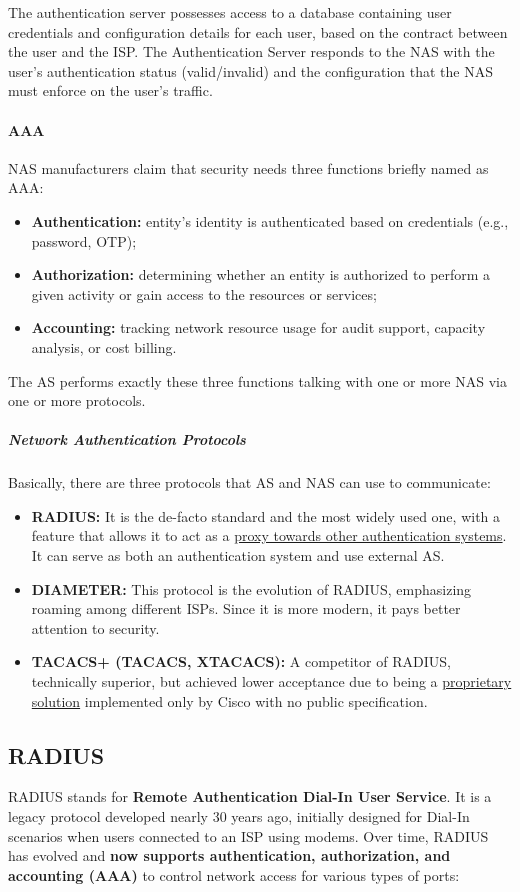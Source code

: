 The authentication server possesses access to a database containing user credentials and configuration details for each user, based on the contract between the user and the ISP. The Authentication Server responds to the NAS with the user's authentication status (valid/invalid) and the configuration that the NAS must enforce on the user's traffic.

\paragraph{AAA}
NAS manufacturers claim that security needs three functions briefly named as AAA:
\begin{itemize}
    \item \textbf{Authentication:} entity's identity is authenticated based on credentials (e.g., password, OTP);
    \item \textbf{Authorization:} determining whether an entity is authorized to perform a given activity or gain access to the resources or services;
    \item \textbf{Accounting:} tracking network resource usage for audit support, capacity analysis, or cost billing.
\end{itemize}

The AS performs exactly these three functions talking with one or more NAS via one or more protocols.

\subparagraph{Network Authentication Protocols}
Basically, there are three protocols that AS and NAS can use to communicate:
\begin{itemize}
    \item \textbf{RADIUS:} It is the de-facto standard and the most widely used one, with a feature that allows it to act as a \underline{proxy towards other authentication systems}. It can serve as both an authentication system and use external AS.
    \item \textbf{DIAMETER:} This protocol is the evolution of RADIUS, emphasizing roaming among different ISPs. Since it is more modern, it pays better attention to security.
    \item \textbf{TACACS+ (TACACS, XTACACS):} A competitor of RADIUS, technically superior, but achieved lower acceptance due to being a \underline{proprietary solution} implemented only by Cisco with no public specification.
\end{itemize}


\subsection{RADIUS}
RADIUS stands for \textbf{Remote Authentication Dial-In User Service}. It is a legacy protocol developed nearly 30 years ago, initially designed for Dial-In scenarios when users connected to an ISP using modems. Over time, RADIUS has evolved and \textbf{now supports authentication, authorization, and accounting (AAA)} to control network access for various types of ports:

